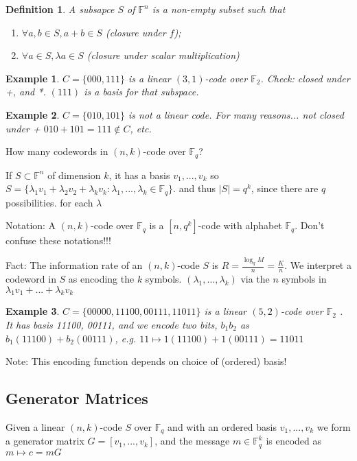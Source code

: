 \documentclass{article}
\newtheorem{defn}{Definition}
\newtheorem{eg}{Example}
\begin{document}
\begin{defn}
    A subsapce $S$ of $\mathbb{F}^n$ is a non-empty subset such that
    \begin{enumerate}
        \item $\forall a,b\in S, a+b\in S$ (closure under $f$);
        \item $\forall a\in S, \lambda a\in S$ (closure under scalar multiplication)
    \end{enumerate}
\end{defn}

\begin{eg}
    $C = \{000, 111\}$ is a linear $(3,1)$-code over $\mathbb{F}_2$. Check:
    closed under +, and *. $(111)$ is a basis for that subspace.
\end{eg}

\begin{eg}
    $C = \{010, 101\}$ is not a linear code. For many reasons... not closed under
    + $010 + 101 = 111 \not\in C$, etc.
\end{eg}

How many codewords in $(n,k)$-code over $\mathbb{F}_q$?

If $S\subset \mathbb{F}^n$ of dimension $k$, it has a basis
$v_1, ..., v_k$ so
$S = \{\lambda_1v_1 + \lambda_2v_2+ \lambda_kv_k: \lambda_1,...,\lambda_k\in
\mathbb{F}_q\}$. and thus $|S| = q^k$, since there are $q$ possibilities. for
each $\lambda$

Notation: A $(n,k)$-code over $\mathbb{F}_q$ is a $[n,q^k]$-code with alphabet
$\mathbb{F}_q$. Don't confuse these notations!!!

Fact: The information rate of an $(n,k)$-code $S$ is
$R = \frac{\log_q M}{n} = \frac{K}{n}$. We interpret a codeword in $S$ as
encoding the $k$ symbols. $(\lambda_1, ..., \lambda_k)$ via the $n$ symbols
in $\lambda_1v_1 + ... + \lambda_kv_k$

\begin{eg}
    $C = \{00000, 11100, 00111, 11011\}$ is a linear $(5,2)$-code over
    $\mathbb{F}_2$ . It has basis 11100, 00111, and we encode two bits,
    $b_1b_2$ as $b_1(11100) + b_2(00111)$, e.g.
    $11\mapsto 1(11100) + 1(00111) = 11011$
\end{eg}

Note: This encoding function depends on choice of (ordered) basis!
\subsection{Generator Matrices}
Given a linear $(n,k)$-code $S$ over $\mathbb{F}_q$ and with an
ordered basis $v_1, ..., v_k$ we form a generator matrix
$G = [v_1, ..., v_k]$, and the message $m\in\mathbb{F}_{q}^k$ is
encoded as $m\mapsto c = mG$
\end{document}

